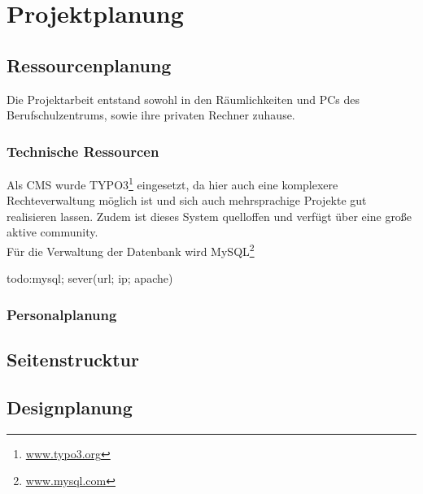 \section{Projektplanung} 
\label{sec:Projektplanung}

\subsection{Ressourcenplanung}
\label{sec:Ressourcenplanung}
Die Projektarbeit entstand sowohl in den Räumlichkeiten und PCs 
des Berufschulzentrums, sowie ihre privaten Rechner zuhause.
\subsubsection{Technische Ressourcen}
\label{sec:TechnischeRessourcen}
Als \acs{CMS} wurde TYPO3\footnote{\url{www.typo3.org}} eingesetzt, da hier auch eine komplexere 
Rechteverwaltung möglich ist und sich auch mehrsprachige Projekte
gut realisieren lassen. Zudem ist dieses System quelloffen und verfügt
über eine große aktive community.\\
Für die Verwaltung der Datenbank wird MySQL\footnote{\url{www.mysql.com}}


todo:mysql; sever(url; ip; apache)
\subsubsection{Personalplanung}
\label{sec:Personalplanung}
\subsection{Seitenstrucktur}
\label{sec:Seitenstrucktur}
\subsection{Designplanung}
\label{sec:Designplanung}